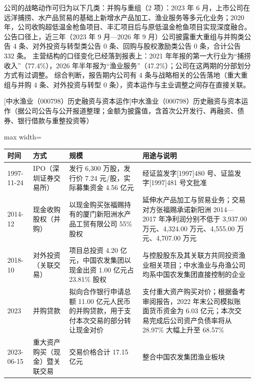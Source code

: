  公司的战略动作可归为以下几类：并购与重组（2 项）：2023 年 6 月，上市公司在远洋捕捞、水产品贸易的基础上新增水产品加工、渔业服务等多元化业务；2020 年，公司收购超低温金枪鱼项目、丰汇项目后与原低温金枪鱼项目实现深度融合。 公告口径上，近三年（2023 年 9 月---2026 年 9 月）公司披露重大重组与并购类公告 4 条、对外投资与转型类公告 0 条、回购与股权激励类公告 0 条，合计公告 332 条。 主营结构的口径变化已经落到报表上：2021 年年报的第一大行业为“捕捞收入”（77.4\%），2026 年半年报为“渔业服务”（47.2\%）；公司在这两期的分部划分方式有过调整。 综合判断，报告期内公司有 4 条与战略相关的公告落地（重大重组与并购 4 条、对外投资与转型 0 条），资本运作与主业调整之间存在直接关联。

\begin{center}\small\setlength{\tabcolsep}{4pt}
[中水渔业（000798）历史融资与资本运作]{中水渔业（000798）历史融资与资本运作（据公司公告与公开报道整理；金额为披露值，含首次公开发行、再融资、债券、银行借款与重整投资等）}
\begin{adjustbox}{max width=\textwidth}
\begin{tabular}{@{}p{1.45cm}p{2.55cm}p{4.05cm}p{4.95cm}@{}}
\toprule
时间 & 方式 & 规模 & 用途与说明 \\
\midrule
1997-11-24 & IPO（深圳证券交易所） & 发行 6,\allowbreak{}300 万股，\allowbreak{}发行价 7.24 元/\allowbreak{}股，\allowbreak{}实际募集资金 4.56 亿元 & 经证监发字[1997]480 号、\allowbreak{}证监发字[1997]481 号文批准 \\
2014-12 & 现金收购股权（并购） & 以现金购买张福赐持有的厦门新阳洲水产品工贸有限公司 55\% 股权 & 延伸水产品加工与贸易业务；交易对方张福赐承诺新阳洲 2014—2017 年净利润分别不低于 3,\allowbreak{}937.00 万元、\allowbreak{}4,\allowbreak{}324.00 万元、\allowbreak{}4,\allowbreak{}555.00 万元、\allowbreak{}4,\allowbreak{}707.00 万元 \\
2018-10 & 对外投资（关联交易） & 项目总投资 4.20 亿元，\allowbreak{}中国农发集团以现金出资 1.00 亿元占 23.81\% 股权 & 与控股股东及其关联方共同投资渔业相关项目；中水渔业与舟渔公司均系中国农发集团直接控制的企业 \\
2023 & 并购贷款 & 拟向合作银行申请总额 11.00 亿元人民币的并购贷款，\allowbreak{}用于支付本次交易的部分转让现金对价 & 支付重大资产购买对价；根据备考审阅报告，\allowbreak{}2022 年末公司模拟账面货币资金为 6.03 亿元；本次交易完成后公司资产负债率将从 28.97\% 大幅上升至 68.57\% \\
2023-06-15 & 重大资产购买（现金）暨关联交易 & 交易价格合计 17.15 亿元 & 整合中国农发集团渔业板块 \\
\bottomrule
\end{tabular}
\end{adjustbox}
\end{center}

